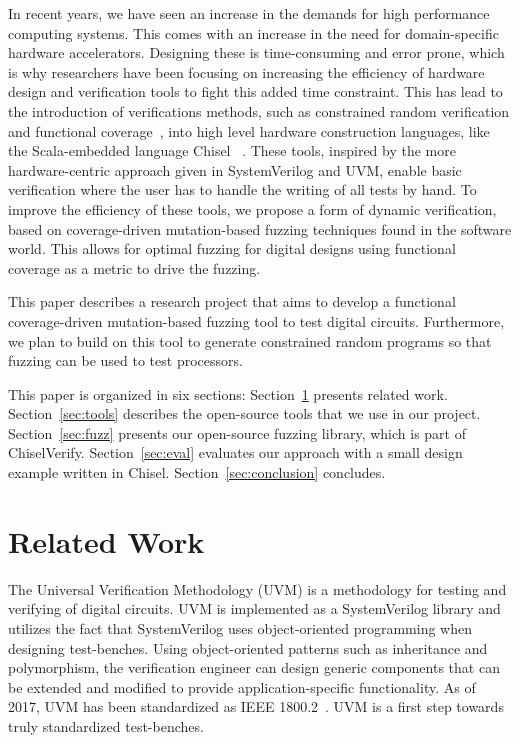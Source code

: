 \documentclass[conference]{IEEEtran}
\begin{document}
In recent years, we have seen an increase in the demands for high performance computing systems.  
This comes with an increase in the need for domain-specific hardware accelerators.  
Designing these is time-consuming and error prone, which is why researchers have been focusing on increasing the efficiency of hardware design and verification tools to fight this added time constraint.
This has lead to the introduction of verifications methods, such as constrained random verification and functional coverage~\cite{verify:chisel:2020, dobis2021opensource}, into high level hardware construction languages, like the Scala-embedded language Chisel~\cite{chisel:dac2012, chisel:book} .
These tools, inspired by the more hardware-centric approach given in SystemVerilog and UVM, enable basic verification where the user has to handle the writing of all tests by hand.
To improve the efficiency of these tools, we propose a form of dynamic verification, based on coverage-driven mutation-based fuzzing techniques found in the software world.
This allows for optimal fuzzing for digital designs using functional coverage as a metric to drive the fuzzing.

This paper describes a research project that aims to develop a functional coverage-driven mutation-based fuzzing tool to test digital circuits.
Furthermore, we plan to build on this tool to generate constrained random programs so that fuzzing can be used to test processors.

This paper is organized in six sections: %
Section~\ref{sec:related}  presents related work.
Section~\ref{sec:tools} describes the open-source tools that we use in our project.
Section~\ref{sec:fuzz} presents our open-source fuzzing library, which is part of ChiselVerify.
Section~\ref{sec:eval} evaluates our approach with a small design example written in Chisel.
Section~\ref{sec:conclusion} concludes.


\section{Related Work}
\label{sec:related}

The Universal Verification Methodology (UVM) is a methodology for testing and verifying of digital circuits.
UVM is implemented as a SystemVerilog library and utilizes the fact that SystemVerilog uses object-oriented programming when designing test-benches.
Using object-oriented patterns such as inheritance and polymorphism, the verification engineer can design generic components that can be extended and modified to provide application-specific functionality.
As of 2017, UVM has been standardized as IEEE 1800.2~\cite{IEEE:18002}.
UVM is a first step towards truly standardized test-benches.
\end{document}
